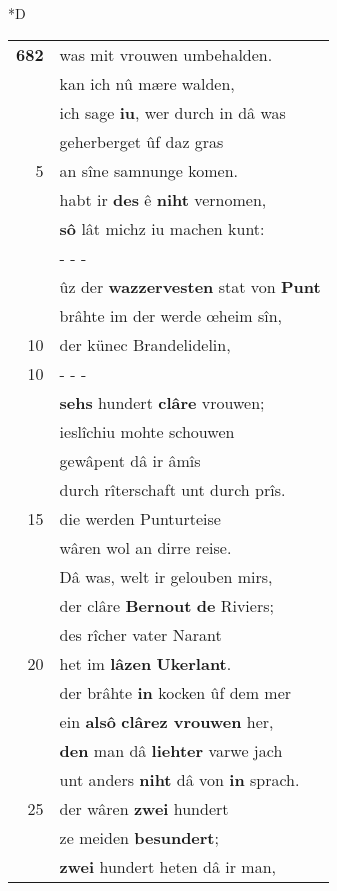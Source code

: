\documentclass[8pt,a4paper,notitlepage]{article}
\begin{document}
\begin{table}[ht]
\begin{minipage}[t]{0.5\linewidth}
\small
\begin{center}*D
\end{center}
\begin{tabular}{rl}
\textbf{682} & was mit vrouwen umbehalden.\\ 
 & kan ich nû mære walden,\\ 
 & ich sage \textbf{iu}, wer durch in dâ was\\ 
 & geherberget ûf daz gras\\ 
5 & an sîne samnunge komen.\\ 
 & habt ir \textbf{des} ê \textbf{niht} vernomen,\\ 
 & \textbf{sô} lât michz iu machen kunt:\\ 
 & \multicolumn{1}{l}{ - - - }\\ 
 & ûz der \textbf{wazzervesten} stat von \textbf{Punt}\\ 
 & brâhte im der werde œheim sîn,\\ 
10 & der künec Brandelidelin,\\ 
10 & \multicolumn{1}{l}{ - - - }\\ 
 & \textbf{sehs} hundert \textbf{clâre} vrouwen;\\ 
 & ieslîchiu mohte schouwen\\ 
 & gewâpent dâ ir âmîs\\ 
 & durch rîterschaft unt durch prîs.\\ 
15 & die werden Punturteise\\ 
 & wâren wol an dirre reise.\\ 
 & Dâ was, welt ir gelouben mirs,\\ 
 & der clâre \textbf{Bernout} \textbf{de} Riviers;\\ 
 & des rîcher vater Narant\\ 
20 & het im \textbf{lâzen} \textbf{Ukerlant}.\\ 
 & der brâhte \textbf{in} kocken ûf dem mer\\ 
 & ein \textbf{alsô} \textbf{clârez vrouwen} her,\\ 
 & \textbf{den} man dâ \textbf{liehter} varwe jach\\ 
 & unt anders \textbf{niht} dâ von \textbf{in} sprach.\\ 
25 & der wâren \textbf{zwei} hundert\\ 
 & ze meiden \textbf{besundert};\\ 
 & \textbf{zwei} hundert heten dâ ir man,\\ 

\end{tabular}
\end{minipage}
\end{table}
\end{document}
